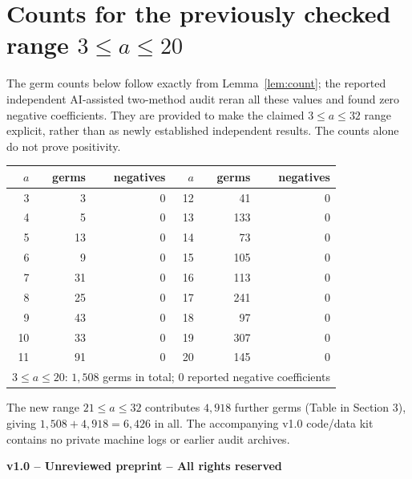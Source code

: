 \documentclass[11pt,a4paper]{article}
\begin{document}
\section[Counts for the previously checked range 3 <= a <= 20]{Counts for the previously checked range $3\le a\le20$}
The germ counts below follow exactly from Lemma~\ref{lem:count}; the reported independent AI-assisted two-method audit reran all these values and found zero negative coefficients. They are provided to make the claimed $3\le a\le32$ range explicit, rather than as newly established independent results. The counts alone do not prove positivity.\par\medskip
\begin{center}
\small
\setlength{\tabcolsep}{9pt}
\begin{tabular}{r r r@{\qquad}r r r}
\toprule
$a$ & germs & negatives & $a$ & germs & negatives\\
\midrule
3 & 3 & 0 & 12 & 41 & 0\\
4 & 5 & 0 & 13 & 133 & 0\\
5 & 13 & 0 & 14 & 73 & 0\\
6 & 9 & 0 & 15 & 105 & 0\\
7 & 31 & 0 & 16 & 113 & 0\\
8 & 25 & 0 & 17 & 241 & 0\\
9 & 43 & 0 & 18 & 97 & 0\\
10 & 33 & 0 & 19 & 307 & 0\\
11 & 91 & 0 & 20 & 145 & 0\\
\midrule
\multicolumn{6}{c}{$3\le a\le20$: $1{,}508$ germs in total; $0$ reported negative coefficients}\\
\bottomrule
\end{tabular}
\end{center}
The new range $21\le a\le32$ contributes $4{,}918$ further germs (Table in Section 3), giving $1{,}508+4{,}918=6{,}426$ in all. The accompanying v1.0 code/data kit contains no private machine logs or earlier audit archives.

\vfill
\begin{center}\small\textbf{v1.0 -- Unreviewed preprint -- All rights reserved}\end{center}
\end{document}
